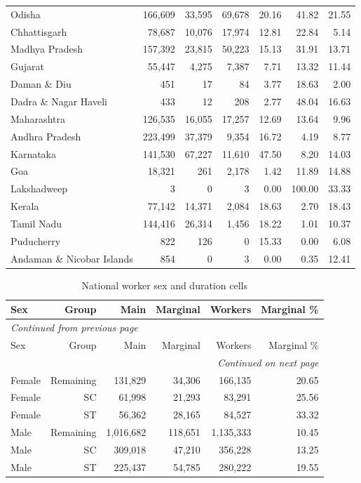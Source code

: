 \documentclass[11pt,a4paper]{report}
\begin{document}
\begin{longtable}{>{\raggedright\arraybackslash}p{4cm}rrrrrr}
Odisha & 166,609 & 33,595 & 69,678 & 20.16 & 41.82 & 21.55 \\
Chhattisgarh & 78,687 & 10,076 & 17,974 & 12.81 & 22.84 & 5.14 \\
Madhya Pradesh & 157,392 & 23,815 & 50,223 & 15.13 & 31.91 & 13.71 \\
Gujarat & 55,447 & 4,275 & 7,387 & 7.71 & 13.32 & 11.44 \\
Daman \& Diu & 451 & 17 & 84 & 3.77 & 18.63 & 2.00 \\
Dadra \& Nagar Haveli & 433 & 12 & 208 & 2.77 & 48.04 & 16.63 \\
Maharashtra & 126,535 & 16,055 & 17,257 & 12.69 & 13.64 & 9.96 \\
Andhra Pradesh & 223,499 & 37,379 & 9,354 & 16.72 & 4.19 & 8.77 \\
Karnataka & 141,530 & 67,227 & 11,610 & 47.50 & 8.20 & 14.03 \\
Goa & 18,321 & 261 & 2,178 & 1.42 & 11.89 & 14.88 \\
Lakshadweep & 3 & 0 & 3 & 0.00 & 100.00 & 33.33 \\
Kerala & 77,142 & 14,371 & 2,084 & 18.63 & 2.70 & 18.43 \\
Tamil Nadu & 144,416 & 26,314 & 1,456 & 18.22 & 1.01 & 10.37 \\
Puducherry & 822 & 126 & 0 & 15.33 & 0.00 & 6.08 \\
Andaman \& Nicobar Islands & 854 & 0 & 3 & 0.00 & 0.35 & 12.41 \\
\end{longtable}\endgroup
\begingroup\footnotesize\setlength{\tabcolsep}{4pt}
\begin{longtable}{lrrrrr}
\caption{National worker sex and duration cells}\\\toprule
Sex & Group & Main & Marginal & Workers & Marginal \% \\\midrule\endfirsthead
\multicolumn{6}{l}{\textit{Continued from previous page}}\\\toprule
Sex & Group & Main & Marginal & Workers & Marginal \% \\\midrule\endhead
\midrule\multicolumn{6}{r}{\textit{Continued on next page}}\\\endfoot\bottomrule\endlastfoot
Female & Remaining & 131,829 & 34,306 & 166,135 & 20.65 \\
Female & SC & 61,998 & 21,293 & 83,291 & 25.56 \\
Female & ST & 56,362 & 28,165 & 84,527 & 33.32 \\
Male & Remaining & 1,016,682 & 118,651 & 1,135,333 & 10.45 \\
Male & SC & 309,018 & 47,210 & 356,228 & 13.25 \\
Male & ST & 225,437 & 54,785 & 280,222 & 19.55 \\
\end{longtable}\endgroup
\end{document}
